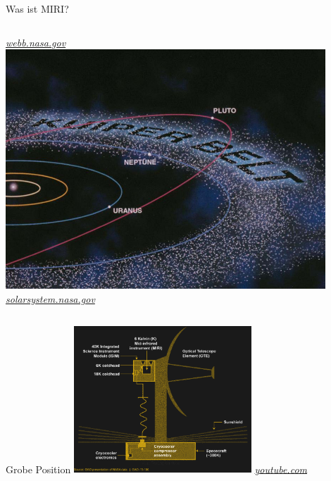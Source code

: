 \documentclass[aspectratio=1610, 9pt, xcolor=dvipsnames]{beamer}
\begin{document}
\begin{frame}{Was ist MIRI?}
\begin{columns}
  \hspace*{12pt}\hbox{\scriptsize {\footnotesize\itshape \href{https://webb.nasa.gov/content/observatory/instruments/miri.html}
  {webb.nasa.gov}}}
  \centering
    \includegraphics[width = 0.9\textwidth]{Plots/kuper.jpg}
  \hspace*{12pt}\hbox{\scriptsize {\footnotesize\itshape \href{https://solarsystem.nasa.gov/news/792/10-things-to-know-about-the-kuiper-belt/}
  {solarsystem.nasa.gov}}}
  \end{columns}
\end{frame}
\begin{frame}{Grobe Position}
  \centering
  \includegraphics[width=0.5\textwidth]{Plots/position.png}
  \hspace*{12pt}\hbox{\scriptsize {\footnotesize\itshape \href{https://www.youtube.com/watch?v=FUH61gx149c}
  {youtube.com}}}
\end{frame}
\end{document}
